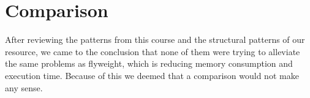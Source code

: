\section{Comparison}
After reviewing the patterns from this course and the structural patterns of our resource, we came to the conclusion that none of them were trying to alleviate the same problems as flyweight, which is reducing memory consumption and execution time. Because of this we deemed that a comparison would not make any sense.